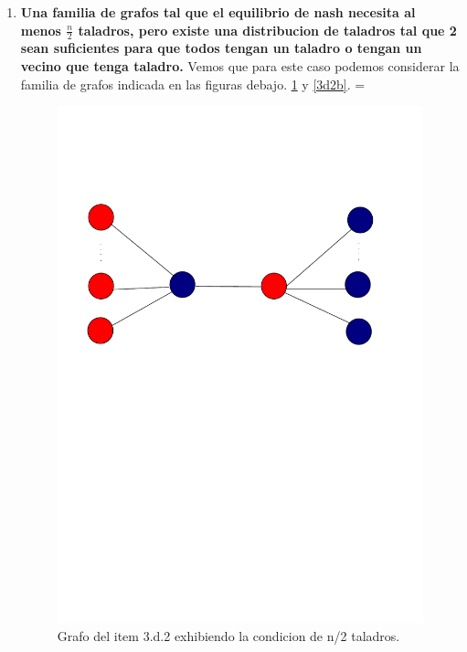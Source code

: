 \begin{enumerate}
	\item \textbf{Una familia de grafos tal que el equilibrio de nash necesita al menos $\frac{n}{2}$ taladros, pero existe una distribucion de taladros tal que 2 sean suficientes para que todos tengan un taladro o tengan un vecino que tenga taladro.} Vemos que para este caso podemos considerar la familia de grafos indicada en las figuras debajo. \ref{3d2} y \ref{3d2b}. =
	\begin{figure}
		\label{3d2}
	  \centering	
		\includegraphics[scale=0.30]{fig/grafo3d2.pdf}
	  \caption{Grafo del item 3.d.2 exhibiendo la condicion de n/2 taladros.}
	\end{figure}


\end{enumerate}
